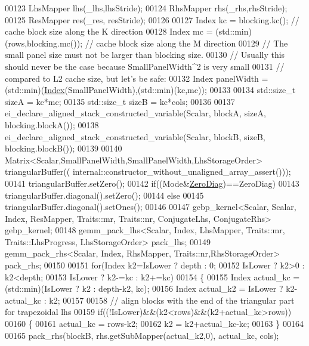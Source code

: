 \begin{DoxyCode}
00123     LhsMapper lhs(\_lhs,lhsStride);
00124     RhsMapper rhs(\_rhs,rhsStride);
00125     ResMapper res(\_res, resStride);
00126 
00127     Index kc = blocking.kc();                   \textcolor{comment}{// cache block size along the K direction}
00128     Index mc = (std::min)(rows,blocking.mc());  \textcolor{comment}{// cache block size along the M direction}
00129     \textcolor{comment}{// The small panel size must not be larger than blocking size.}
00130     \textcolor{comment}{// Usually this should never be the case because SmallPanelWidth^2 is very small}
00131     \textcolor{comment}{// compared to L2 cache size, but let's be safe:}
00132     Index panelWidth = (std::min)(\hyperlink{namespace_eigen_a62e77e0933482dafde8fe197d9a2cfde}{Index}(SmallPanelWidth),(std::min)(kc,mc));
00133 
00134     std::size\_t sizeA = kc*mc;
00135     std::size\_t sizeB = kc*cols;
00136 
00137     ei\_declare\_aligned\_stack\_constructed\_variable(Scalar, blockA, sizeA, blocking.blockA());
00138     ei\_declare\_aligned\_stack\_constructed\_variable(Scalar, blockB, sizeB, blocking.blockB());
00139 
00140     Matrix<Scalar,SmallPanelWidth,SmallPanelWidth,LhsStorageOrder> triangularBuffer((
      internal::constructor\_without\_unaligned\_array\_assert()));
00141     triangularBuffer.setZero();
00142     \textcolor{keywordflow}{if}((Mode&\hyperlink{group__enums_gga39e3366ff5554d731e7dc8bb642f83cda884ff7240392e85aa6e4b3c957e36483}{ZeroDiag})==ZeroDiag)
00143       triangularBuffer.diagonal().setZero();
00144     \textcolor{keywordflow}{else}
00145       triangularBuffer.diagonal().setOnes();
00146 
00147     gebp\_kernel<Scalar, Scalar, Index, ResMapper, Traits::mr, Traits::nr, ConjugateLhs, ConjugateRhs> 
      gebp\_kernel;
00148     gemm\_pack\_lhs<Scalar, Index, LhsMapper, Traits::mr, Traits::LhsProgress, LhsStorageOrder> pack\_lhs;
00149     gemm\_pack\_rhs<Scalar, Index, RhsMapper, Traits::nr,RhsStorageOrder> pack\_rhs;
00150 
00151     \textcolor{keywordflow}{for}(Index k2=IsLower ? depth : 0;
00152         IsLower ? k2>0 : k2<depth;
00153         IsLower ? k2-=kc : k2+=kc)
00154     \{
00155       Index actual\_kc = (std::min)(IsLower ? k2 : depth-k2, kc);
00156       Index actual\_k2 = IsLower ? k2-actual\_kc : k2;
00157 
00158       \textcolor{comment}{// align blocks with the end of the triangular part for trapezoidal lhs}
00159       \textcolor{keywordflow}{if}((!IsLower)&&(k2<rows)&&(k2+actual\_kc>rows))
00160       \{
00161         actual\_kc = rows-k2;
00162         k2 = k2+actual\_kc-kc;
00163       \}
00164 
00165       pack\_rhs(blockB, rhs.getSubMapper(actual\_k2,0), actual\_kc, cols);

\end{DoxyCode}
